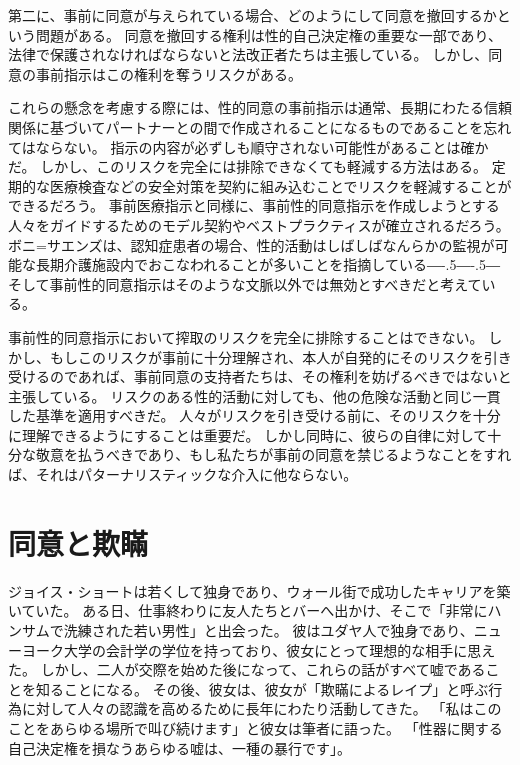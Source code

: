 \documentclass[paper=a4,book,openany]{jlreq}
\def\DDASH{―\kern-.5\zw―\kern-.5\zw―}
\begin{document}
第二に、事前に同意が与えられている場合、どのようにして同意を撤回するかという問題がある。
同意を撤回する権利は性的自己決定権の重要な一部であり、法律で保護されなければならないと法改正者たちは主張している。
しかし、同意の事前指示はこの権利を奪うリスクがある。

これらの懸念を考慮する際には、性的同意の事前指示は通常、長期にわたる信頼関係に基づいてパートナーとの間で作成されることになるものであることを忘れてはならない。
指示の内容が必ずしも順守されない可能性があることは確かだ。
しかし、このリスクを完全には排除できなくても軽減する方法はある。
定期的な医療検査などの安全対策を契約に組み込むことでリスクを軽減することができるだろう。
事前医療指示と同様に、事前性的同意指示を作成しようとする人々をガイドするためのモデル契約やベストプラクティスが確立されるだろう。
ボニ=サエンズは、認知症患者の場合、性的活動はしばしばなんらかの監視が可能な長期介護施設内でおこなわれることが多いことを指摘している{\DDASH}そして事前性的同意指示はそのような文脈以外では無効とすべきだと考えている\citep[p.43]{boni-saenz15:_sexual_incap}。

事前性的同意指示において搾取のリスクを完全に排除することはできない。
しかし、もしこのリスクが事前に十分理解され、本人が自発的にそのリスクを引き受けるのであれば、事前同意の支持者たちは、その権利を妨げるべきではないと主張している。
リスクのある性的活動に対しても、他の危険な活動と同じ一貫した基準を適用すべきだ。
人々がリスクを引き受ける前に、そのリスクを十分に理解できるようにすることは重要だ。
しかし同時に、彼らの自律に対して十分な敬意を払うべきであり、もし私たちが事前の同意を禁じるようなことをすれば、それはパターナリスティックな介入に他ならない。

\section{同意と欺瞞}

ジョイス・ショートは若くして独身であり、ウォール街で成功したキャリアを築いていた。
ある日、仕事終わりに友人たちとバーへ出かけ、そこで「非常にハンサムで洗練された若い男性」と出会った。
彼はユダヤ人で独身であり、ニューヨーク大学の会計学の学位を持っており、彼女にとって理想的な相手に思えた。
しかし、二人が交際を始めた後になって、これらの話がすべて嘘であることを知ることになる。
その後、彼女は、彼女が「欺瞞によるレイプ」と呼ぶ行為に対して人々の認識を高めるために長年にわたり活動してきた。
「私はこのことをあらゆる場所で叫び続けます」と彼女は筆者に語った。
「性器に関する自己決定権を損なうあらゆる嘘は、一種の暴行です」\citep{mcarthur16:_is_lying_get_laid_form_sexual_assaul}。
\end{document}

